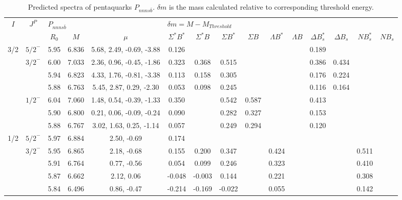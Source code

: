 \documentclass[prd,twocolumn,floatfix,nofootinbib]{revtex4}
\begin{document}
\renewcommand{\tabcolsep}{0.1cm}
\renewcommand{\arraystretch}{1.0}
\begin{table*}[!htbp]
    \caption{Predicted spectra of pentaquarks $P_{nnns\bar{b}}$.
        $\delta m$ is the mass calculated relative to corresponding threshold energy.}
    \label{tab:nnnsb}
    \begin{tabular}{cc|ccc|cccccccccc}
        \bottomrule[1.5pt]\bottomrule[0.5pt]
        \multirow{2}{*}{$I$} &\multirow{2}{*}{$J^{P}$} 
        &\multicolumn{3}{l|}{$P_{nnns\bar{b}}$} 
        &\multicolumn{10}{l}{$\delta m=M-M_{Threshold}$} \\
        & &$R_{0}$ &$M$ &$\mu$
        &$\Sigma^{\ast} B^{\ast}$ &$\Sigma^{\ast} B$ &$\Sigma B^{\ast}$ &$\Sigma B$ 
        &$\Lambda B^{\ast}$ &$\Lambda B$ &$\Delta B^{\ast}_{s}$ &$\Delta B_{s}$ 
        &$N B^{\ast}_{s}$ &$N B_{s}$ \\ \hline
        3/2
            &${5/2}^{-}$    &5.95   &6.836  &5.68, 2.49, -0.69, -3.88 &0.126 & & & & & &0.189 & & & \\
            &${3/2}^{-}$    &6.00   &7.033  &2.36, 0.96, -0.45, -1.86 &0.323 &0.368 &0.515 & & & &0.386 &0.434 & & \\
            &               &5.94   &6.823  &4.33, 1.76, -0.81, -3.38 &0.113 &0.158 &0.305 & & & &0.176 &0.224 & & \\
            &               &5.88   &6.763  &5.45, 2.87, 0.29, -2.30 &0.053 &0.098 &0.245 & & & &0.116 &0.164 & & \\
            &${1/2}^{-}$    &6.04   &7.060  &1.48, 0.54, -0.39, -1.33 &0.350 & &0.542 &0.587 & & &0.413 & & & \\
            &               &5.90   &6.800  &0.21, 0.06, -0.09, -0.24 &0.090 & &0.282 &0.327 & & &0.153 & & & \\
            &               &5.88   &6.767  &3.02, 1.63, 0.25, -1.14 &0.057 & &0.249 &0.294 & & &0.120 & & & \\
        1/2
            &${5/2}^{-}$    &5.97   &6.884  &2.50, -0.69 &0.174 & & & & & & & & & \\
            &${3/2}^{-}$    &5.95   &6.865  &2.18, -0.68 &0.155 &0.200 &0.347 & &0.424 & & & &0.511 & \\
            &               &5.91   &6.764  &0.77, -0.56 &0.054 &0.099 &0.246 & &0.323 & & & &0.410 & \\
            &               &5.87   &6.662  &2.12, 0.06 &-0.048 &-0.003 &0.144 & &0.221 & & & &0.308 & \\
            &               &5.84   &6.496  &0.86, -0.47 &-0.214 &-0.169 &-0.022 & &0.055 & & & &0.142 & \\

\end{tabular}
\end{table*}
\end{document}

